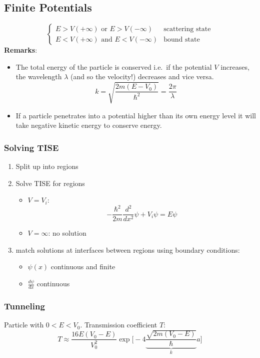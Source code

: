 \subsection{Finite Potentials}
\noindent\begin{equation*}
    \begin{cases}
        E > V(+\infty)\text{ or } E > V(-\infty)  & \text{scattering state} \\
        E < V(+\infty)\text{ and } E < V(-\infty) & \text{bound state}
    \end{cases}
\end{equation*}
\textbf{Remarks}:

\begin{itemize}
    \item The total energy of the particle is conserved i.e.\ if the potential $V$ increases, the wavelength $\lambda$ (and so the velocity!) decreases and vice versa.
          \noindent\begin{equation*}
              k=\sqrt{\frac{2m(E-V_0)}{\hbar^2}} = \frac{2\pi}{\lambda}
          \end{equation*}
    \item If a particle penetrates into a potential higher than its own energy level it will take negative kinetic energy to conserve energy.
\end{itemize}

\subsubsection{Solving TISE}
\begin{enumerate}
    \item Split up into regions
    \item Solve TISE for regions
          \begin{itemize}
              \item $V=V_i$:
                    \noindent\begin{equation*}
                        -\frac{\hbar^2}{2m}\frac{d^2}{dx^2} \psi + V_i\psi=E\psi
                    \end{equation*}
              \item $V=\infty$: no solution
          \end{itemize}
    \item match solutions at interfaces between regions using boundary conditions:
          \begin{itemize}
              \item $\psi(x)$ continuous and finite
              \item $\frac{d\psi}{dx}$ continuous
          \end{itemize}
\end{enumerate}

\subsubsection{Tunneling}
Particle with $0<E<V_0$. Transmission coefficient $T$:
\noindent\begin{equation*}
    T\approx\frac{16E(V_0-E)}{V_0^2}\exp\Biggl[-4 \underbrace{\frac{\sqrt{2m(V_0-E)}}{\hbar}}_{k} a\Biggr]
\end{equation*}
